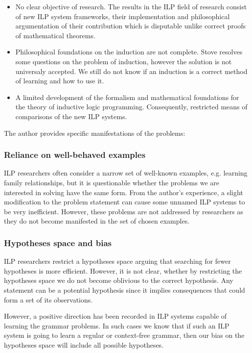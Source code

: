 \begin{itemize}
\item No clear objective of research. The results in the ILP field of research consist of new ILP system frameworks, their implementation and philosophical argumentation of their contribution which is disputable unlike correct proofs of mathematical theorems.
\item Philosophical foundations on the induction are not complete. Stove \cite{stove1986rationality} resolves some questions on the problem of induction, however the solution is not universaly accepted. We still do not know if an induction is a correct method of learning and how to use it.
\item A limited development of the formalism and mathematical foundations for the theory of inductive logic programming. Consequently, restricted means of comparisons of the new ILP systems.
\end{itemize}

The author provides specific manifestations of the problems:

\subsubsection{Reliance on well-behaved examples}
ILP researchers often consider a narrow set of well-known examples, e.g. learning family relationships, but it is questionable whether the problems we are interested in solving have the same form. From the author's experience, a slight modification to the problem statement can cause some unnamed ILP systems to be very inefficient. However, these problems are not addressed by researchers as they do not become manifested in the set of chosen examples.

\subsubsection{Hypotheses space and bias}
ILP researchers restrict a hypotheses space arguing that searching for fewer hypotheses is more efficient. However, it is not clear, whether by restricting the hypotheses space we do not become oblivious to the correct hypothesis. Any statement can be a potential hypothesis since it implies consequences that could form a set of its observations.

However, a positive direction has been recorded in ILP systems capable of learning the grammar problems. In such cases we know that if such an ILP system is going to learn a regular or context-free grammar, then our bias on the hypotheses space will include all possible hypotheses.

